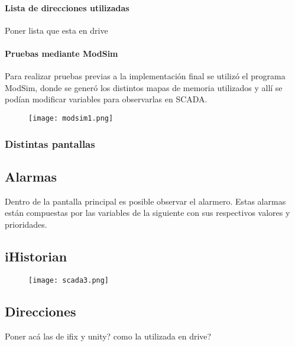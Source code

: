 \paragraph{Lista de direcciones utilizadas}
Poner lista que esta en drive
\paragraph{Pruebas mediante ModSim}
Para realizar pruebas previas a la implementación final se utilizó el programa ModSim, donde se generó los distintos mapas de memoria utilizados y allí se podían modificar variables para observarlas en SCADA.

\begin{figure}[htb]
	\centering
	\texttt{[image: modsim1.png]}
	\label{fig:modsim1}
\end{figure}

\subsubsection{Distintas pantallas}


\subsection{Alarmas}
Dentro de la pantalla principal es posible observar el alarmero. Estas alarmas están compuestas por las variables de la siguiente  con sus respectivos valores y prioridades.\\
\subsection{iHistorian}
\begin{figure}[htb]
	\centering
	\texttt{[image: scada3.png]}
	\label{fig:scada3}
\end{figure}

\subsection{Direcciones}
Poner acá las de ifix y unity? como la utilizada en drive?